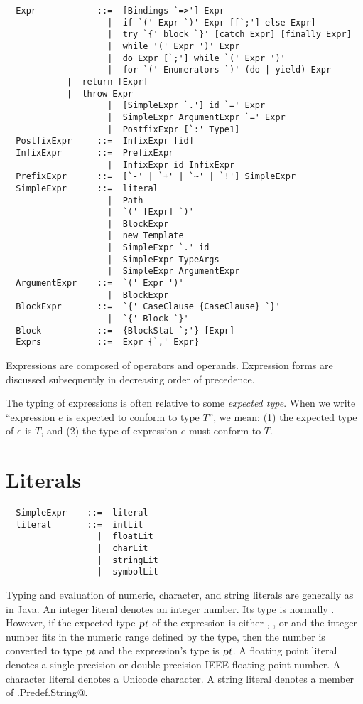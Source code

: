 \documentclass[a4paper,12pt,twoside,titlepage]{book}
\newcommand{\proto}{\mbox{\sl pt}}
\begin{document}
\syntax\begin{lstlisting}
  Expr            ::=  [Bindings `=>'] Expr
                    |  if `(' Expr `)' Expr [[`;'] else Expr]
                    |  try `{' block `}' [catch Expr] [finally Expr]
                    |  while '(' Expr ')' Expr
                    |  do Expr [`;'] while `(' Expr ')'
                    |  for `(' Enumerators `)' (do | yield) Expr
		    |  return [Expr]
		    |  throw Expr
                    |  [SimpleExpr `.'] id `=' Expr
                    |  SimpleExpr ArgumentExpr `=' Expr
                    |  PostfixExpr [`:' Type1]
  PostfixExpr     ::=  InfixExpr [id]
  InfixExpr       ::=  PrefixExpr
                    |  InfixExpr id InfixExpr
  PrefixExpr      ::=  [`-' | `+' | `~' | `!'] SimpleExpr 
  SimpleExpr      ::=  literal
                    |  Path
                    |  `(' [Expr] `)'
                    |  BlockExpr
                    |  new Template 
                    |  SimpleExpr `.' id 
                    |  SimpleExpr TypeArgs
                    |  SimpleExpr ArgumentExpr
  ArgumentExpr    ::=  `(' Expr ')'
                    |  BlockExpr
  BlockExpr       ::=  `{' CaseClause {CaseClause} `}'
                    |  `{' Block `}'
  Block           ::=  {BlockStat `;'} [Expr]
  Exprs           ::=  Expr {`,' Expr}
\end{lstlisting}

Expressions are composed of operators and operands. Expression forms are
discussed subsequently in decreasing order of precedence. 

The typing of expressions is often relative to some {\em expected
type}.  When we write ``expression $e$ is expected to conform to
type $T$'', we mean: (1) the expected type of $e$ is
$T$, and (2) the type of expression $e$ must conform to
$T$.

\section{Literals}

\syntax\begin{lstlisting}
  SimpleExpr    ::=  literal
  literal       ::=  intLit
                  |  floatLit
                  |  charLit
                  |  stringLit
                  |  symbolLit
\end{lstlisting}

Typing and evaluation of numeric, character, and string literals are
generally as in Java.  An integer literal denotes an integer
number. Its type is normally . However, if the expected type
$\proto$ of the expression is either , , or
 and the integer number fits in the numeric range defined
by the type, then the number is converted to type $\proto$ and the
expression's type is $\proto$.  A floating point literal denotes a
single-precision or double precision IEEE floating point number. A
character literal denotes a Unicode character. A string literal
denotes a member of \lstinline@scala.Predef.String@.
\end{document}
